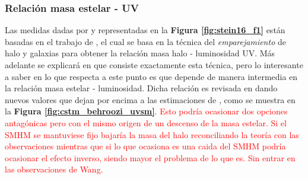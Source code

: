 \subsubsection{Relación masa estelar - UV} 
Las medidas dadas por \cite{bouwens2015reionization} y \cite{bouwens2015uv} representadas en la \textbf{Figura \ref{fig:stein16_f1}} están basadas en el trabajo de \cite{finkelstein2015increasing}, el cual se basa en la técnica del \textit{emparejamiento} de halo y galaxias para obtener la relación masa halo - luminosidad UV. Más adelante se explicará en que consiste exactamente esta técnica, pero lo interesante a saber en lo que respecta a este punto es que depende de manera intermedia en la relación masa estelar - luminosidad. Dicha relación es revisada en \cite{behroozi2019universemachine} dando nuevos valores que dejan por encima a las estimaciones de \cite{finkelstein2015increasing},\cite{finkelstein2015evolution} como se muestra en la \textbf{Figura \ref{fig:cstm_behroozi_uvsm}}.  \textcolor{red}{Esto podría ocasionar dos opciones antagónicas pero con el mismo origen de un descenso de la masa estelar. Si el SMHM se mantuviese fijo bajaría la masa del halo reconciliando la teoría con las observaciones mientras que si lo que ocasiona es una caida del SMHM podría ocasionar el efecto inverso, siendo mayor el problema de lo que es. Sin entrar en las observaciones de Wang. }
 
